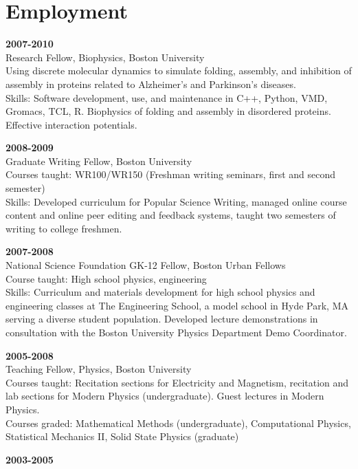 \documentclass[letterpaper]{article}
\renewenvironment{itemize}{
  \begin{list}{}{
    \setlength{\leftmargin}{1.5em}
  }
}{
  \end{list}
}
\begin{document}
\section*{Employment}
\begin{itemize}
	\item \textbf{2007-2010} \\
	Research Fellow, Biophysics, Boston University \\  
	Using discrete molecular dynamics to simulate folding, assembly,
	and inhibition of assembly in proteins related to Alzheimer's and
	Parkinson's diseases.  \\
	Skills: Software development, use, and maintenance in C++, Python, VMD, Gromacs, TCL, R.  Biophysics of folding and assembly in disordered proteins.  Effective interaction potentials.  
	\item \textbf{2008-2009} \\
	Graduate Writing Fellow, Boston University \\  
	Courses taught: WR100/WR150 (Freshman writing seminars, first and second semester) \\  
	Skills: Developed curriculum for Popular Science Writing, managed online course content and online peer editing and feedback systems, taught two semesters of writing to college freshmen.  
	\item \textbf{2007-2008} \\
	National Science Foundation GK-12 Fellow, Boston Urban Fellows \\  
	Course taught: High school physics, engineering  \\
	Skills: Curriculum and materials development for high school physics and engineering classes at The Engineering School, a model school in Hyde Park, MA serving a diverse student population.  Developed lecture demonstrations in consultation with the Boston University Physics Department Demo Coordinator.  
	\item \textbf{2005-2008} \\
	Teaching Fellow, Physics, Boston University \\  
	Courses taught: Recitation sections for Electricity and Magnetism, recitation and lab sections for Modern Physics (undergraduate). Guest lectures in Modern Physics.  \\
	Courses graded: Mathematical Methods (undergraduate), Computational Physics, Statistical Mechanics II, Solid State Physics (graduate)   
	\item \textbf{2003-2005}\\

\end{itemize}
\end{document}
